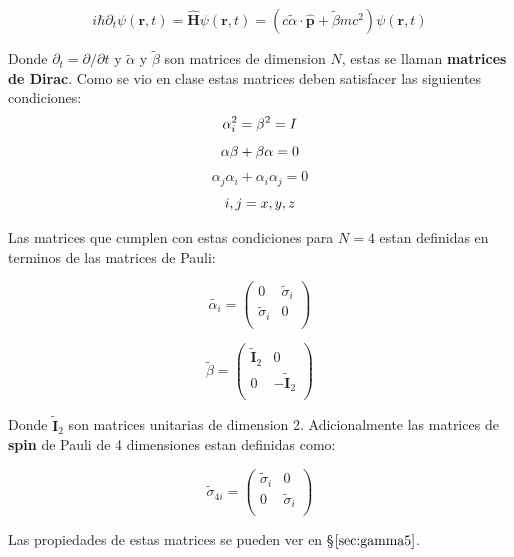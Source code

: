 \documentclass[a4paper, 12pt]{article} %
\begin{document}
\begin{equation}\label{dirac}
i\hbar \partial_t \psi(\mathbf{r},t) = \hat{\mathbf{H}}\psi(\mathbf{r},t) =
(c\widetilde{\alpha}\cdot \hat{\mathbf{p}} + \widetilde{\beta}mc^2)\psi(\mathbf{r},t)
\end{equation}

Donde $\partial_t = \partial / \partial t$ y $\widetilde{\alpha}$ y $\widetilde{\beta}$ son matrices de dimension $N$, 
estas se llaman \textbf{matrices de Dirac}.
Como se vio en clase estas matrices deben satisfacer las siguientes condiciones:\\

\[
\alpha_i^2 = \beta^2 = I \\
\]
\[
\alpha \beta + \beta \alpha = 0 \\
\]
\[
\alpha_j \alpha_i + \alpha_i \alpha_j = 0
\]
\[
i,j=x, y, z\\
\] 

Las matrices que cumplen con estas condiciones para $N=4$ estan definidas en terminos
de las matrices de Pauli:

\begin{equation}
\widetilde{\alpha_i}=
\begin{pmatrix}
0 & \widetilde{\sigma}_i\\
\widetilde{\sigma}_i & 0 \\
\end{pmatrix}
\end{equation}

\begin{equation}
\widetilde{\beta}=
\begin{pmatrix}
\widetilde{\mathbf{I}}_2 & 0\\
0 & -\widetilde{\mathbf{I}}_2 \\
\end{pmatrix}
\end{equation}

Donde $\widetilde{\mathbf{I}}_2$ son matrices unitarias de dimension 2. 
Adicionalmente las matrices de \textbf{spin} de Pauli de 4 dimensiones
estan definidas como:

\begin{equation}
\widetilde{\sigma}_{4i}=
\begin{pmatrix}
\widetilde{\sigma}_i & 0 \\
0 & \widetilde{\sigma}_i  \\
\end{pmatrix}
\end{equation}

Las propiedades de estas matrices se pueden ver en \S$\ref{sec:gamma5}$.
\end{document}

